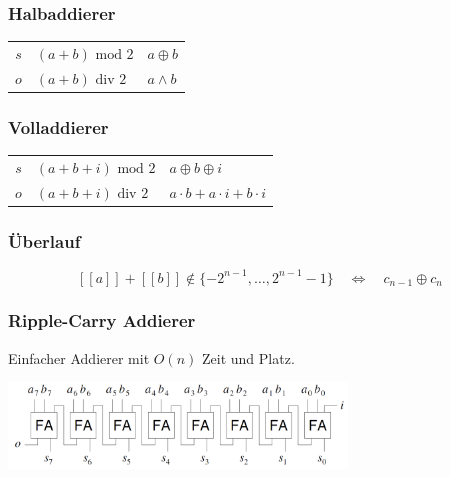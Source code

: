 	\begin{multicols}{2}
		\subsubsection{Halbaddierer}
			\begin{tabular}{r@{\quad$\equiv$\quad}l@{\quad$\equiv$\quad}l}
				$s$ & $(a + b) \text{ mod } 2$ & $a \oplus b$ \\
				$o$ & $(a + b) \text{ div } 2$ & $a \land b$ \\
			\end{tabular}
		
		\subsubsection{Volladdierer}
			\begin{tabular}{r@{\quad$\equiv$\quad}l@{\quad$\equiv$\quad}l}
				$s$ & $(a + b + i) \text{ mod } 2$ & $a \oplus b \oplus i $ \\
				$o$ & $(a + b + i) \text{ div } 2$ & $ a \cdot b + a \cdot i + b \cdot i$ \\
			\end{tabular}
			
		\subsubsection{Überlauf}
		\[ [\![a]\!] + [\![b]\!] \notin \{-2^{n-1}, \ldots, 2^{n-1}-1\} \quad \iff \quad c_{n-1} \oplus c_n \]
			
		\subsubsection{Ripple-Carry Addierer}
		Einfacher Addierer mit $O(n)$ Zeit und Platz.
			\begin{center}
			\includegraphics[width = 9cm]{images/arith/ripple.png}
			\end{center}
		
	\end{multicols}
	
	\vspace{8mm}
	
